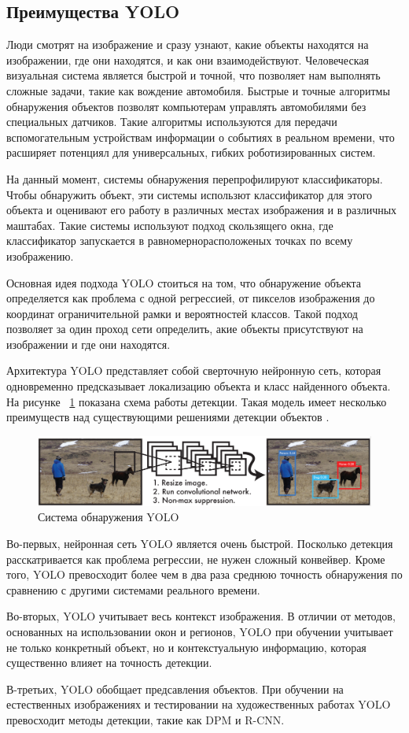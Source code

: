 \documentclass[a4paper,english,russian]{G2-105}
\begin{document}
\subsection{Преимущества YOLO}
\par Люди смотрят на изображение и сразу узнают, какие объекты находятся на изображении, где они находятся, и как они взаимодействуют. Человеческая визуальная система является быстрой и точной, что позволяет нам выполнять сложные задачи, такие как вождение автомобиля. Быстрые и точные алгоритмы обнаружения объектов позволят компьютерам управлять автомобилями без специальных датчиков. Такие алгоритмы используются для передачи вспомогательным устройствам информации о событиях в реальном времени, что расширяет потенциял для универсальных, гибких роботизированных систем.
\par На данный момент, системы обнаружения перепрофилируют классификаторы. Чтобы обнаружить объект, эти системы использют классификатор для этого объекта и оценивают его работу в различных местах изображения и в различных маштабах. Такие системы используют подход скользящего окна, где классификатор запускается в равномернорасположеных точках по всему изображению.
\par Основная идея подхода YOLO стоиться на том, что обнаружение объекта определяется как проблема с одной регрессией, от пикселов изображения до координат ограничительной рамки и вероятностей классов. Такой подход позволяет за один проход сети определить, акие объекты присутствуют на изображении и где они находятся.
\par Архитектура YOLO представляет собой сверточную нейронную сеть, которая одновременно предсказывает локализацию объекта и класс найденного объекта. На рисунке ~\ref{yolo} показана схема работы детекции. Такая модель имеет несколько преимуществ над существующими решениями детекции объектов \cite{17}.
\begin{figure}
    \includegraphics[width=\linewidth]{yolo.png}
    \caption{Система обнаружения YOLO}
	\label{yolo}
\end{figure}
\par Во-первых, нейронная сеть YOLO является очень быстрой. Посколько детекция расскатривается как проблема регрессии, не нужен сложный конвейвер. Кроме того, YOLO превосходит более чем в два раза среднюю точность обнаружения по сравнению с другими системами реального времени.
\par Во-вторых, YOLO учитывает весь контекст изображения. В отличии от методов, основанных на использовании окон и регионов, YOLO при обучении учитывает не только конкретный объект, но и контекстуальную информацию, которая существенно влияет на точность детекции. 
\par В-третьих, YOLO обобщает предсавления объектов. При обучении на естественных изображениях и тестировании на художественных работах YOLO превосходит методы детекции, такие как DPM и R-CNN.
\end{document}
